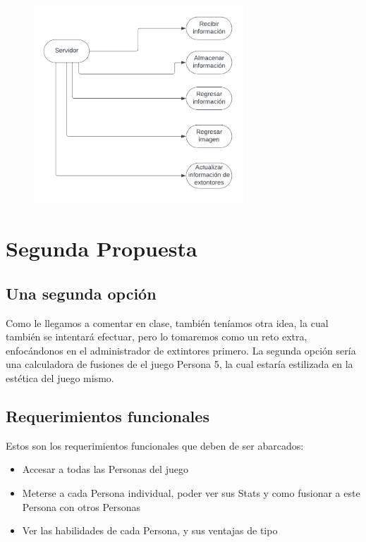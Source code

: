 \documentclass[a4paper,twoside,10pt]{report}
\begin{document}
\begin{figure}[htbp]
	\centering
		\includegraphics[width=0.70\textwidth]{Gmaing2.png}
	\label{fig:Gmaing2}
\end{figure}



\newpage 

\chapter{Segunda Propuesta}

\section{Una segunda opción}

\par Como le llegamos a comentar en clase, también teníamos otra idea, la cual también se intentará efectuar, pero lo tomaremos como un reto extra, enfocándonos en el administrador de extintores primero. La segunda opción sería una calculadora de fusiones de el juego Persona 5, la cual estaría estilizada en la estética del juego mismo.

\section{Requerimientos funcionales}

\par Estos son los requerimientos funcionales que deben de ser abarcados:

\begin{itemize}
	\item Accesar a todas las Personas del juego
	\item Meterse a cada Persona individual, poder ver sus Stats y como fusionar a este Persona con otros Personas
	\item Ver las habilidades de cada Persona, y sus ventajas de tipo
\end{itemize}
\end{document}
